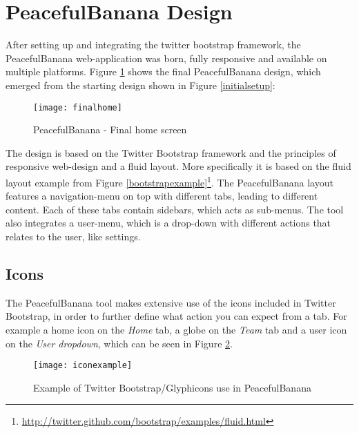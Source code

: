\section{PeacefulBanana Design}
After setting up and integrating the twitter bootstrap framework, the PeacefulBanana web-application was born, fully responsive and available on multiple platforms. Figure \ref{finalhome} shows the final PeacefulBanana design, which emerged from the starting design shown in Figure \ref{initialsetup}:
\begin{figure}[H]
\centering
	\texttt{[image: finalhome]}
\caption{PeacefulBanana - Final home screen}
\label{finalhome}
\end{figure}
The design is based on the Twitter Bootstrap framework and the principles of responsive web-design and a fluid layout. More specifically it is based on the fluid layout example from Figure \ref{bootstrapexample}\footnote{\url{http://twitter.github.com/bootstrap/examples/fluid.html}}. The PeacefulBanana layout features a navigation-menu on top with different tabs, leading to different content. Each of these tabs contain sidebars, which acts as sub-menus. The tool also integrates a user-menu, which is a drop-down with different actions that relates to the user, like settings.

\subsection{Icons}
The PeacefulBanana tool makes extensive use of the icons included in Twitter Bootstrap, in order to further define what action you can expect from a tab. For example a home icon on the \textit{Home} tab, a globe on the \textit{Team} tab and a user icon on the \textit{User dropdown}, which can be seen in Figure \ref{iconexample}.
\begin{figure}[H]
\centering
	\texttt{[image: iconexample]}
\caption{Example of Twitter Bootstrap/Glyphicons use in PeacefulBanana \citep{twitterbootstrap}}
\label{iconexample}
\end{figure}

